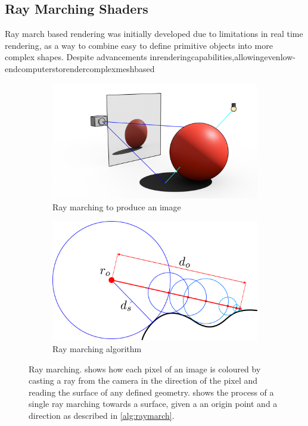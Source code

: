 \documentclass{l4proj}
\begin{document}
\subsection{Ray Marching Shaders}

Ray march based rendering was initially developed due to limitations in real time rendering, as a way to combine easy to define primitive objects into more complex shapes. Despite advancements in\hfill rendering\hfill capabilities,\hfill allowing\hfill even\hfill low-end\hfill computers\hfill to\hfill render\hfill complex\hfill mesh\hfill based 
\begin{figure}[H]
  \centering
  \begin{subfigure}[b]{0.45\textwidth}
      \includegraphics[width=\textwidth]{images/raymarching/raymarch_ai.png}
      \caption{Ray marching to produce an image}
      \label{fig:rmcast}
  \end{subfigure}
  \begin{subfigure}[b]{0.45\textwidth}
      \includegraphics[width=\textwidth]{images/raymarching/algorithm_ai.png}
      \caption{Ray marching algorithm}
      \label{fig:rmalg}
  \end{subfigure}   
  \caption{Ray marching.  shows how each pixel of an image is coloured by casting a ray from the camera in the direction of the pixel and reading the surface of any defined geometry. 
   shows the process of a single ray marching towards a surface, given a an origin point and a direction as described in \cref{alg:raymarch}.
  }\label{fig:raymarch}
\end{figure}
\end{document}
